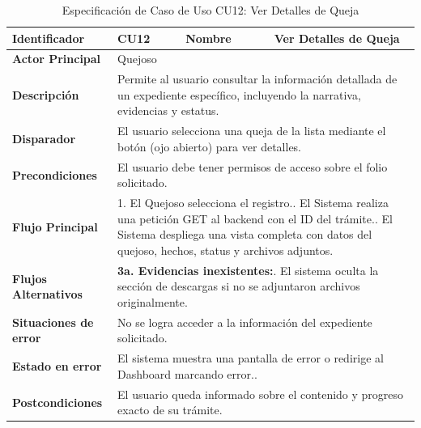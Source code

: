\vspace{0.8cm}

\begingroup
\setlength{\parskip}{0pt}
\begin{longtable}{|p{3.5cm}|p{2cm}|p{2.5cm}|p{7cm}|}
\caption{Especificación de Caso de Uso CU12: Ver Detalles de Queja}
\label{tab:cu12_ver_detalles} \\
\hline
\textbf{Identificador} & CU12 & \textbf{Nombre} & Ver Detalles de Queja \\ \hline
\textbf{Actor Principal} & \multicolumn{3}{p{11.5cm}|}{Quejoso} \\ \hline
\textbf{Descripción} & \multicolumn{3}{p{11.5cm}|}{Permite al usuario consultar la información detallada de un expediente específico, incluyendo la narrativa, evidencias y estatus.} \\ \hline
\textbf{Disparador} & \multicolumn{3}{p{11.5cm}|}{El usuario selecciona una queja de la lista mediante el botón (ojo abierto) para ver detalles.} \\ \hline
\textbf{Precondiciones} & \multicolumn{3}{p{11.5cm}|}{El usuario debe tener permisos de acceso sobre el folio solicitado.} \\ \hline
\textbf{Flujo Principal} & \multicolumn{3}{p{11.5cm}|}{1. El Quejoso selecciona el registro.\newline 2. El Sistema realiza una petición GET al backend con el ID del trámite.\newline 3. El Sistema despliega una vista completa con datos del quejoso, hechos, status y archivos adjuntos.} \\ \hline
\textbf{Flujos Alternativos} & \multicolumn{3}{p{11.5cm}|}{\textbf{3a. Evidencias inexistentes:}\newline 1. El sistema oculta la sección de descargas si no se adjuntaron archivos originalmente.} \\ \hline
\textbf{Situaciones de error} & \multicolumn{3}{p{11.5cm}|}{No se logra acceder a la información del expediente solicitado.} \\ \hline
\textbf{Estado en error} & \multicolumn{3}{p{11.5cm}|}{El sistema muestra una pantalla de error o redirige al Dashboard marcando error..} \\ \hline
\textbf{Postcondiciones} & \multicolumn{3}{p{11.5cm}|}{El usuario queda informado sobre el contenido y progreso exacto de su trámite.} \\ \hline
\end{longtable}
\endgroup

